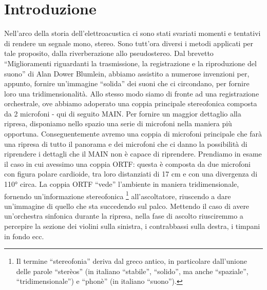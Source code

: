\documentclass{article}
\begin{document}
\section{Introduzione}
    Nell'arco della storia dell'elettroacustica ci sono stati svariati momenti e tentativi di rendere un segnale mono, stereo. Sono tutt'ora diversi i metodi applicati per tale proposito, dalla riverberazione allo pseudostereo. Dal brevetto ``Miglioramenti riguardanti la trasmissione, la registrazione e la riproduzione del suono'' di Alan Dower Blumlein, abbiamo assistito a numerose invenzioni per, appunto, fornire un'immagine ``solida'' dei suoni che ci circondano, per fornire loro una tridimensionalità.
    Allo stesso modo siamo di fronte ad una registrazione orchestrale, ove abbiamo adoperato una coppia principale stereofonica composta da 2 microfoni - qui di seguito MAIN. Per fornire un maggior dettaglio alla ripresa, disponiamo nello spazio una serie di microfoni nella maniera più opportuna. Conseguentemente avremo una coppia di microfoni principale che farà una ripresa di tutto il panorama e dei microfoni che ci danno la possibilità di riprendere i dettagli che il MAIN non è capace di riprendere. Prendiamo in esame il caso in cui avessimo una coppia ORTF: questa è composta da due microfoni con figura polare cardioide, tra loro distanziati di 17 cm e con una divergenza di 110° circa. La coppia ORTF ``vede'' l'ambiente in maniera tridimensionale, fornendo un'informazione stereofonica
    \footnote{Il termine ``stereofonia'' deriva dal greco antico, in particolare dall'unione delle parole ``sterèos'' (in italiano ``stabile'', ``solido'', ma anche ``spaziale'', ``tridimensionale'') e ``phonè'' (in italiano ``suono'').}
    all'ascoltatore, riuscendo a dare un'immagine di quello che sta succedendo sul palco. Mettendo il caso di avere un'orchestra sinfonica durante la ripresa, nella fase di ascolto riusciremmo a percepire la sezione dei violini sulla sinistra, i contrabbassi sulla destra, i timpani in fondo ecc.
\end{document}
